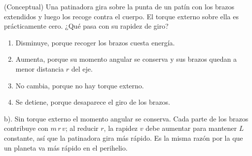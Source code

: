 \documentclass[12pt, a4paper]{article}
\begin{document}
\begin{exercise}[ID=patinadora, tags={banco}]
(Conceptual) Una patinadora gira sobre la punta de un patín con los brazos extendidos y luego los recoge contra el cuerpo. El torque externo sobre ella es prácticamente cero. ¿Qué pasa con su rapidez de giro?
\begin{enumerate}
    \item Disminuye, porque recoger los brazos cuesta energía.
    \item Aumenta, porque su momento angular se conserva y sus brazos quedan a menor distancia $r$ del eje.
    \item No cambia, porque no hay torque externo.
    \item Se detiene, porque desaparece el giro de los brazos.
\end{enumerate}
\end{exercise}
\begin{solution}
b). Sin torque externo el momento angular se conserva. Cada parte de los brazos contribuye con $m\,r\,v$; al reducir $r$, la rapidez $v$ debe aumentar para mantener $L$ constante, así que la patinadora gira más rápido. Es la misma razón por la que un planeta va más rápido en el perihelio.
\end{solution}
\end{document}
